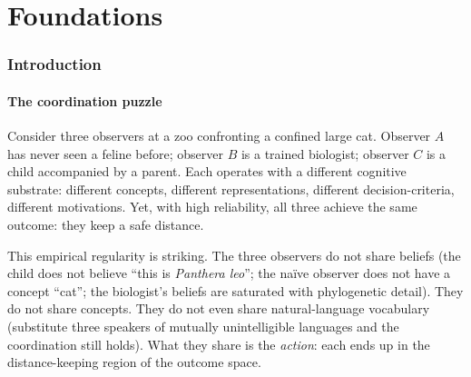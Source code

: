 \documentclass[11pt,twocolumn,a4paper]{article}
\begin{document}
\tableofcontents


\part{Foundations}

\section{Introduction}
\label{sec:intro}

\subsection{The coordination puzzle}

Consider three observers at a zoo confronting a confined large cat.
Observer $A$ has never seen a feline before; observer $B$ is a trained
biologist; observer $C$ is a child accompanied by a parent. Each operates
with a different cognitive substrate: different concepts, different
representations, different decision-criteria, different motivations.
Yet, with high reliability, all three achieve the same outcome: they
keep a safe distance.

This empirical regularity is striking. The three observers do not share
beliefs (the child does not believe ``this is \emph{Panthera leo}''; the
naïve observer does not have a concept ``cat''; the biologist's beliefs
are saturated with phylogenetic detail). They do not share concepts.
They do not even share natural-language vocabulary (substitute three
speakers of mutually unintelligible languages and the coordination still
holds). What they share is the \emph{action}: each ends up in the
distance-keeping region of the outcome space.
\end{document}
